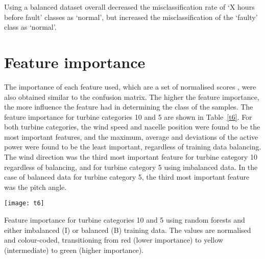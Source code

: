 Using a balanced dataset overall decreased the misclassification rate of `X hours before fault' classes as `normal', but increased the misclassification of the `faulty' class as `normal'.

\section{Feature importance}

The importance of each feature used, which are a set of normalised scores \cite{Rudy13}, were also obtained similar to the confusion matrix. The higher the feature importance, the more influence the feature had in determining the class of the samples. The feature importance for turbine categories 10 and 5 are shown in Table~\ref{t6}. For both turbine categories, the wind speed and nacelle position were found to be the most important features, and the maximum, average and deviations of the active power were found to be the least important, regardless of training data balancing. The wind direction was the third most important feature for turbine category 10 regardless of balancing, and for turbine category 5 using imbalanced data. In the case of balanced data for turbine category 5, the third most important feature was the pitch angle.

\begin{table}
    \centering
    \texttt{[image: t6]}
    \caption{\label{t6}Feature importance for turbine categories 10 and 5 using random forests and either imbalanced (I) or balanced (B) training data. The values are normalised and colour-coded, transitioning from red (lower importance) to yellow (intermediate) to green (higher importance).}
\end{table}
